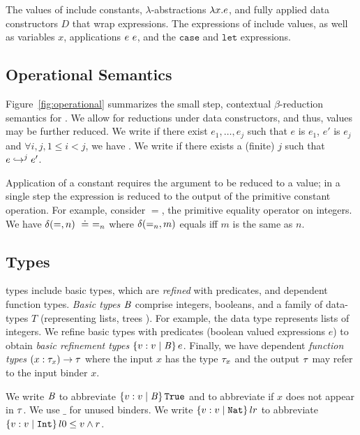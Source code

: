 The values of \undeclang include constants, 
$\lambda$-abstractions $\efun{x}{\typ}{e}$, and 
fully applied data constructors $D$ that wrap expressions.
%
The expressions of \undeclang include values, as well as
variables $x$, 
applications $\eapp{e}{e}$, 
and the $\mathtt{case}$ 
and $\mathtt{let}$ expressions.

\subsection{Operational Semantics}

Figure~\ref{fig:operational} summarizes the small 
step, contextual $\beta$-reduction semantics for 
\undeclang.
%
We allow for reductions under data constructors, 
and thus, values may be further reduced.
%
We write  if there exist $e_1,\ldots,e_j$ such that
$e$ is $e_1$, $e'$ is $e_j$ and $\forall i,j, 1 \leq i < j$, we have
.
%
We write  if there exists a (finite) $j$ such that
$\evalj{e}{e'}{j}$.

 Application of a constant requires the
argument to be reduced to a value; in a single step the 
expression is reduced to the output of the primitive 
constant operation. 
%
For example, consider $=$, the primitive equality operator 
on integers. We have $\ceval{=}{n} \defeq =_n$
where $\ceval{=_n}{m}$ equals \etrue iff $m$ is the same as $n$.

\subsection{Types}

\undeclang types include basic types, which are \emph{refined} with predicates, 
and dependent function types.
%
\emph{Basic types} $\Base$ comprise integers, booleans, and a family of data-types 
$T$ (representing lists, trees \etc).
%
For example, the data type \tintlist represents lists of integers.
%
We refine basic types with predicates (boolean valued expressions $e$) to obtain
\emph{basic refinement types} $\tref{v}{\Base}{}{e}$.
%
Finally, we have dependent \emph{function types} $\tfun{x}{\typ_x}{\typ}$ 
where the input $x$ has the type $\typ_x$ and the output $\typ$ may
refer to the input binder $x$.

 We write $\Base$ to abbreviate $\tref{v}{\Base}{}{\etrue}$
and  to abbreviate  if 
$x$ does not appear in $\typ$. 
%
We use $\_$ for unused binders.
We write $\tref{v}{\tnat}{l}{r}$ to abbreviate $\tref{v}{\tint}{l}{0 \leq v \wedge r}$.



